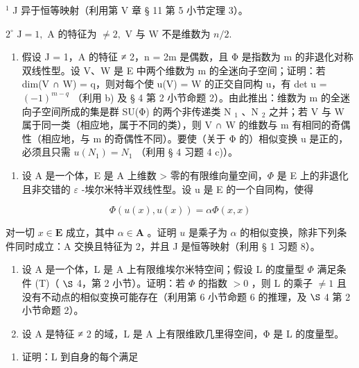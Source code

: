 \(^{1}\) J 异于恒等映射（利用第 V 章 § 11 第 5 小节定理 3）。

\(2^{\circ} \text{ J} = 1, \text{ A 的特征为 } \neq 2, \text{ V 与 W 不是维数为 } n/2.\)

\begin{enumerate}
\def\labelenumi{\alph{enumi})}
\setcounter{enumi}{3}
\tightlist
\item
  假设 J = 1，A 的特征 ≠ 2，n = 2m 是偶数，且 Φ 是指数为 m 的非退化对称双线性型。设 V、W 是 E 中两个维数为 m 的全迷向子空间；证明：若 dim(V ∩ W) = q，则对每个使 u(V) = W 的正交自同构 u，有 det u = \((-1)^{m-q}\) （利用 b) 及 § 4 第 2 小节命题 2）。由此推出：维数为 m 的全迷向子空间所成的集是群 SU(Φ) 的两个非传递类 N \(_{1}\) 、N \(_{2}\) 之并；若 V 与 W 属于同一类（相应地，属于不同的类），则 V ∩ W 的维数与 m 有相同的奇偶性（相应地，与 m 的奇偶性不同）。要使（关于 Φ 的）相似变换 u 是正的，必须且只需 \(u(N_{1}) = N_{1}\) （利用 § 4 习题 4 c)）。
\end{enumerate}

\begin{enumerate}
\def\labelenumi{\arabic{enumi})}
\setcounter{enumi}{18}
\tightlist
\item
  设 A 是一个体，E 是 A 上维数 \textgreater{} 零的有限维向量空间，\(\Phi\) 是 E 上的非退化且非交错的 \(\varepsilon\) -埃尔米特半双线性型。设 u 是 E 的一个自同构，使得
\end{enumerate}

\[
\Phi (u (x), u (x)) = \alpha \Phi (x, x)
\]

对一切 \(x \in \mathbf{E}\) 成立，其中 \(\alpha \in \mathbf{A}\) 。证明 \(u\) 是乘子为 \(\alpha\) 的相似变换，除非下列条件同时成立：A 交换且特征为 2，并且 J 是恒等映射（利用 § 1 习题 8）。

\begin{enumerate}
\def\labelenumi{\arabic{enumi})}
\setcounter{enumi}{19}
\item
  设 A 是一个体，L 是 A 上有限维埃尔米特空间；假设 L 的度量型 \(\Phi\) 满足条件 (T)（ \(\S\) 4，第 2 小节）。证明：若 \(\Phi\) 的指数 \(>0\) ，则 L 的乘子 \(\neq 1\) 且没有不动点的相似变换可能存在（利用第 6 小节命题 6 的推理，及 \(\S\) 4 第 2 小节命题 2）。
\item
  设 A 是特征 ≠ 2 的域，L 是 A 上有限维欧几里得空间，Φ 是 L 的度量型。
\end{enumerate}

\begin{enumerate}
\def\labelenumi{\alph{enumi})}
\tightlist
\item
  证明：L 到自身的每个满足
\end{enumerate}

